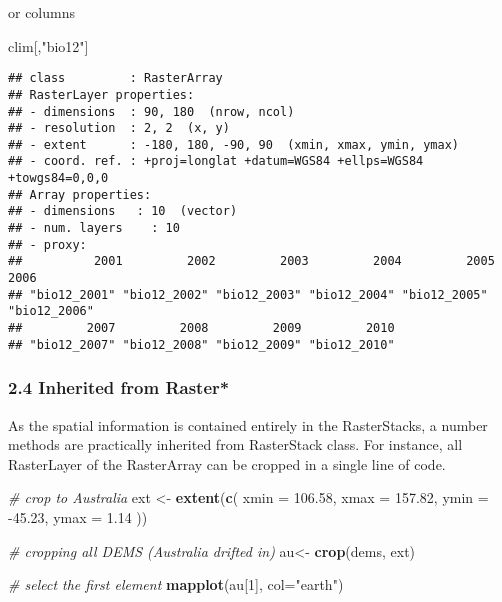 \documentclass[]{article}
\newenvironment{Shaded}{\begin{snugshade}}{\end{snugshade}}
\newcommand{\KeywordTok}[1]{\textcolor[rgb]{0.13,0.29,0.53}{\textbf{#1}}}
\newcommand{\DataTypeTok}[1]{\textcolor[rgb]{0.13,0.29,0.53}{#1}}
\newcommand{\DecValTok}[1]{\textcolor[rgb]{0.00,0.00,0.81}{#1}}
\newcommand{\FloatTok}[1]{\textcolor[rgb]{0.00,0.00,0.81}{#1}}
\newcommand{\StringTok}[1]{\textcolor[rgb]{0.31,0.60,0.02}{#1}}
\newcommand{\CommentTok}[1]{\textcolor[rgb]{0.56,0.35,0.01}{\textit{#1}}}
\newcommand{\NormalTok}[1]{#1}
\begin{document}
or columns

\begin{Shaded}
\begin{Highlighting}[]
\NormalTok{clim[,}\StringTok{"bio12"}\NormalTok{]}
\end{Highlighting}
\end{Shaded}

\begin{verbatim}
## class         : RasterArray 
## RasterLayer properties: 
## - dimensions  : 90, 180  (nrow, ncol)
## - resolution  : 2, 2  (x, y)
## - extent      : -180, 180, -90, 90  (xmin, xmax, ymin, ymax)
## - coord. ref. : +proj=longlat +datum=WGS84 +ellps=WGS84 +towgs84=0,0,0 
## Array properties: 
## - dimensions   : 10  (vector)
## - num. layers    : 10
## - proxy:
##          2001         2002         2003         2004         2005         2006 
## "bio12_2001" "bio12_2002" "bio12_2003" "bio12_2004" "bio12_2005" "bio12_2006" 
##         2007         2008         2009         2010 
## "bio12_2007" "bio12_2008" "bio12_2009" "bio12_2010"
\end{verbatim}

\subsubsection{2.4 Inherited from Raster*}\label{inherited-from-raster}

As the spatial information is contained entirely in the RasterStacks, a
number methods are practically inherited from RasterStack class. For
instance, all RasterLayer of the RasterArray can be cropped in a single
line of code.

\begin{Shaded}
\begin{Highlighting}[]
\CommentTok{# crop to Australia}
\NormalTok{ext <-}\StringTok{ }\KeywordTok{extent}\NormalTok{(}\KeywordTok{c}\NormalTok{(                }
  \DataTypeTok{xmin =} \FloatTok{106.58}\NormalTok{,}
  \DataTypeTok{xmax =} \FloatTok{157.82}\NormalTok{,}
  \DataTypeTok{ymin =} \FloatTok{-45.23}\NormalTok{,}
  \DataTypeTok{ymax =} \FloatTok{1.14} 
\NormalTok{)) }

\CommentTok{# cropping all DEMS (Australia drifted in)}
\NormalTok{au<-}\StringTok{ }\KeywordTok{crop}\NormalTok{(dems, ext)}

\CommentTok{# select the first element}
\KeywordTok{mapplot}\NormalTok{(au[}\DecValTok{1}\NormalTok{], }\DataTypeTok{col=}\StringTok{"earth"}\NormalTok{)}
\end{Highlighting}
\end{Shaded}
\end{document}
